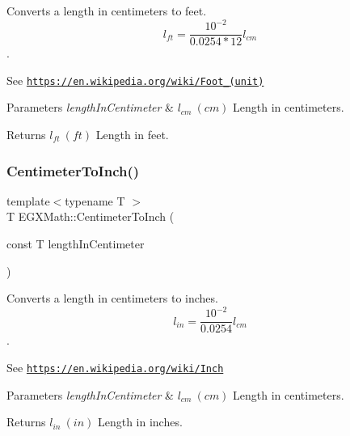 Converts a length in centimeters to feet. \[ l_{ft}= \frac{10^{-2}}{0.0254 * 12} l_{cm} \]. 

See \href{https://en.wikipedia.org/wiki/Foot_(unit)}{\tt https\+://en.\+wikipedia.\+org/wiki/\+Foot\+\_\+(unit)} 
\begin{DoxyParams}{Parameters}
{\em length\+In\+Centimeter} & $ l_{cm}\ (cm)$ Length in centimeters. \\
\hline
\end{DoxyParams}
\begin{DoxyReturn}{Returns}
$ l_{ft}\ (ft)$ Length in feet. 
\end{DoxyReturn}
\mbox{\label{group___e_g_x_math-_conversions-_length_conversions-_s_i-_centimeter-_imperial_ga9d90fd3e24ac92c43f57db3e27a24507}} 
\subsubsection{\texorpdfstring{Centimeter\+To\+Inch()}{CentimeterToInch()}}
{\footnotesize\ttfamily template$<$typename T $>$ \\
T E\+G\+X\+Math\+::\+Centimeter\+To\+Inch (\begin{DoxyParamCaption}\item[{const T}]{length\+In\+Centimeter }\end{DoxyParamCaption})}



Converts a length in centimeters to inches. \[ l_{in}= \frac{10^{-2}}{0.0254} l_{cm} \]. 

See \href{https://en.wikipedia.org/wiki/Inch}{\tt https\+://en.\+wikipedia.\+org/wiki/\+Inch} 
\begin{DoxyParams}{Parameters}
{\em length\+In\+Centimeter} & $ l_{cm}\ (cm)$ Length in centimeters. \\
\hline
\end{DoxyParams}
\begin{DoxyReturn}{Returns}
$ l_{in}\ (in)$ Length in inches. 
\end{DoxyReturn}
\mbox{\label{group___e_g_x_math-_conversions-_length_conversions-_s_i-_centimeter-_imperial_ga4d32adb63d2c5ac44ce1f7a0ba746452}} 
